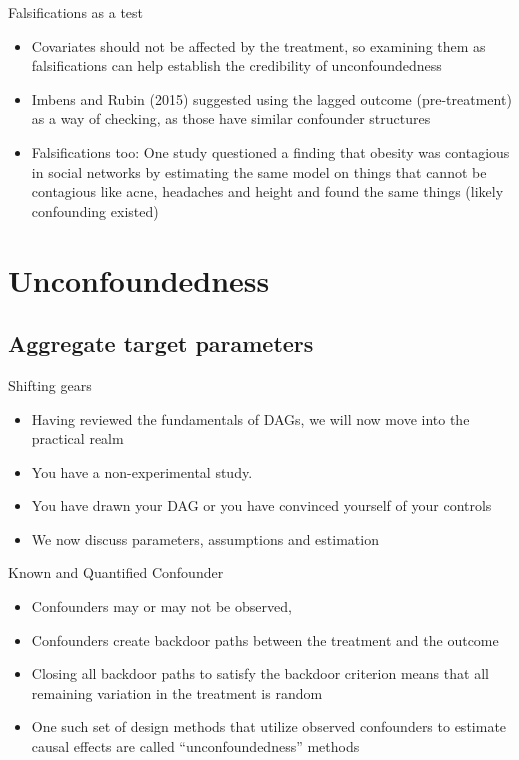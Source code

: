 \documentclass{beamer}
\begin{document}
\begin{frame}{Falsifications as a test}

\begin{itemize}
\item Covariates should not be affected by the treatment, so examining them as falsifications can help establish the credibility of unconfoundedness
\item Imbens and Rubin (2015) suggested using the lagged outcome (pre-treatment) as a way of checking, as those have similar confounder structures
\item Falsifications too: One study questioned a finding that obesity was contagious in social networks by estimating the same model on things that cannot be contagious like acne, headaches and height and found the same things (likely confounding existed)
\end{itemize}

\end{frame}




\section{Unconfoundedness}

\subsection{Aggregate target parameters}

\begin{frame}{Shifting gears}

\begin{itemize}
\item Having reviewed the fundamentals of DAGs, we will now move into the practical realm
\item You have a non-experimental study.  
\item You have drawn your DAG or you have convinced yourself of your controls
\item We now discuss parameters, assumptions and estimation
\end{itemize}

\end{frame}



\begin{frame}{Known and Quantified Confounder}

	\begin{itemize}
	\item Confounders may or may not be observed,
	\item Confounders create backdoor paths between the treatment and the outcome
	\item Closing all backdoor paths to satisfy the backdoor criterion means that all remaining variation in the treatment is random
	\item One such set of design methods that utilize observed confounders to estimate causal effects are called ``unconfoundedness'' methods
	\end{itemize}

\end{frame}
\end{document}
